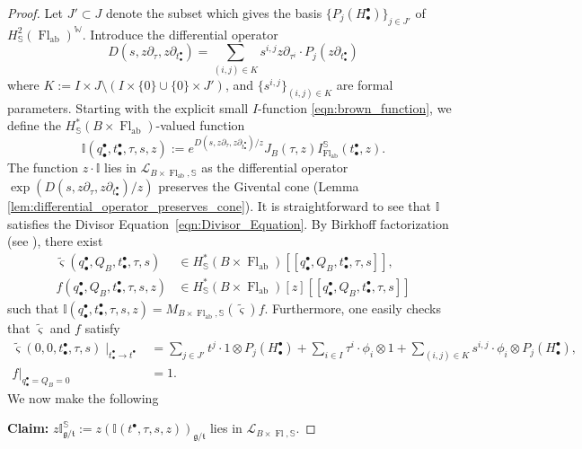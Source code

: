\documentclass[a4paper,12pt]{amsart}
\numberwithin{equation}{section}
\theoremstyle{definition}
\newcommand{\I}{\mathbb{I}}
\newcommand{\bbS}{\mathbb{S}}
\newcommand{\W}{\mathbb{W}}
\newcommand{\cL}{\mathcal{L}}
\newcommand{\gt}{{\mathfrak{g}/\mathfrak{t}}}
\newcommand{\newsigma}{\varsigma}
\newcommand{\Fl}{\operatorname{Fl}}
\newcommand{\FlT}{\operatorname{Fl}_{\operatorname{ab}}}
\begin{document}
\begin{proof}
    Let $J'\subset J$ denote the subset which gives the basis $\{P_j(H_\bullet^\bullet)\}_{j\in J'}$ of $H^2_\bbS(\FlT)^\W$.
    Introduce the differential operator
    \[
    D(s,z\partial_\tau,z\partial_{t_\bullet^\bullet})=\sum_{(i,j)\in K} s^{i,j} z\partial_{\tau^i} \cdot P_j(z\partial_{t_\bullet^\bullet})
    \]
    where $K:= I\times J\setminus(I\times\{0\}\cup\{0\}\times J')$, and $\{s^{i,j}\}_{(i,j)\in K}$ are formal parameters.
    Starting with the explicit small $I$-function \eqref{eqn:brown_function}, we define the $H^*_\bbS(B\times\FlT)$-valued function
    \begin{equation}\label{eqn:I^S}
    \I(q^\bullet_\bullet,t^\bullet_\bullet,\tau,s,z) := e^{D(s,z\partial_\tau,z\partial_{t_\bullet^\bullet})/z}J_B(\tau,z)I_{\FlT}^\bbS(t_\bullet^\bullet,z).
    \end{equation}
    The function $z\cdot \I$ lies in $\cL_{B\times\FlT,\bbS}$ as the differential operator $\exp(D(s,z\partial_\tau,z\partial_{t_\bullet^\bullet})/z)$ preserves the Givental cone (Lemma \ref{lem:differential_operator_preserves_cone}).
    It is straightforward to see that $\I$ satisfies the Divisor Equation~\eqref{eqn:Divisor_Equation}. By Birkhoff factorization (see \cite{CG:quantum}),  there exist 
    \begin{align*}
        \widetilde{\newsigma}(q^\bullet_\bullet,Q_B,t^\bullet_\bullet,\tau,s) &\in H^*_\bbS(B\times\FlT)[\![q^\bullet_\bullet,Q_B,t^\bullet_\bullet,\tau,s]\!], \\
        f(q_\bullet^\bullet,Q_B,t^\bullet_\bullet,\tau,s,z) &\in H^*_\bbS(B\times\FlT)[z][\![q_\bullet^\bullet,Q_B,t^\bullet_\bullet,\tau,s]\!]
    \end{align*} 
    such that $\I(q^\bullet_\bullet,t^\bullet_\bullet,\tau,s,z) = M_{B\times\FlT,\bbS}(\widetilde{\newsigma})f$. Furthermore, one easily checks that $\widetilde{\newsigma}$ and $f$ satisfy
    \begin{align*}
        \widetilde{\newsigma}(0,0,t^\bullet_\bullet,\tau,s)\mid_{t^\bullet_\bullet\to t^\bullet} &= \sum_{j\in J'} t^j\cdot1\otimes P_j(H^\bullet_\bullet) + \sum_{i\in I}\tau^i\cdot\phi_i\otimes1 + \sum_{(i,j)\in K}s^{i,j}\cdot\phi_i\otimes P_j(H_\bullet^\bullet), \\
        f|_{q^\bullet_\bullet=Q_B=0} &= 1.
    \end{align*}
 We now make the following 
\vspace{10pt}
    
    {\bf Claim:} $z\I_\gt^\bbS:=z(\I(t^\bullet,\tau,s,z))_\gt$ lies in $\cL_{B\times\Fl,\bbS}$.


\end{proof}
\end{document}
